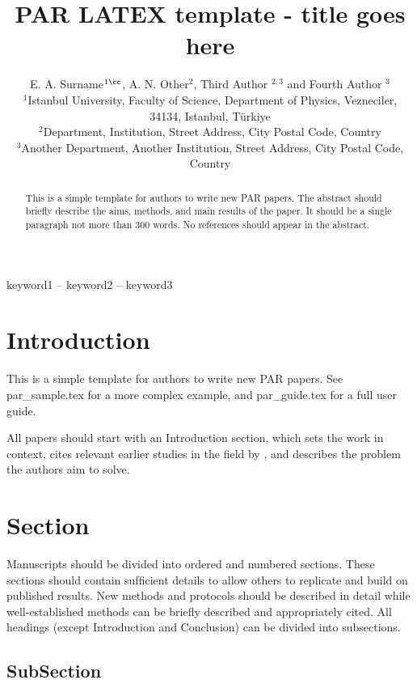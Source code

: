 \documentclass[arxiv,usenatbib]{iupartex}
\title[PAR LATEX template]{PAR LATEX template - title goes here}
\author[Surname et. al]{%
E. A. Surname$^{1\cc}$,\orcid{0000-000X-XXXX-AAAA}
A. N. Other$^{2}$,\orcid{0000-000X-XXXX-BBBB}
Third Author $^{2,3}$\orcid{0000-000X-XXXX-CCCC}
and
Fourth Author $^{3}$\orcid{0000-000X-XXXX-DDDD}
\affsep \\
$^1$Istanbul University, Faculty of Science, Department of Physics, Vezneciler, 34134, Istanbul, T\"{u}rkiye\\
$^2$Department, Institution, Street Address, City Postal Code, Country\\
$^3$Another Department, Another Institution, Street Address, City Postal Code, Country
}
\date{
	\pSubmit{00.00.0000} 
	\pRevReq{00.00.0000}
	\pLastRevRec{00.00.0000}
	\pAccept{00.00.0000}
	\pPubOnl{00.00.0000}
}
\begin{document}
\label{firstpage}
\pagerange{\pageref*{firstpage}--\pageref*{lastpage}}
\maketitle

\begin{abstract}
This is a simple template for authors to write new PAR papers. The abstract should briefly describe the aims, methods, and main results of the paper. It should be a single paragraph not more than 300 words. No references should appear in the abstract.
\end{abstract}

\begin{keywords}
keyword1 -- keyword2 -- keyword3
\end{keywords}



\section{Introduction}
This is a simple template for authors to write new PAR papers. See par\_sample.tex for a more complex example, and par\_guide.tex for a full user guide. 

All papers should start with an Introduction section, which sets the work in context, cites relevant earlier studies in the field by \cite{aut2018}, and describes the problem the authors aim to solve.
 

\section{Section}
Manuscripts should be divided into ordered and numbered sections. These sections should contain sufﬁcient details to allow others to replicate and build on published results. New methods and protocols should be described in detail while well-established methods can be brieﬂy described and appropriately cited. All headings (except Introduction and Conclusion) can be divided into subsections. 

\subsection{SubSection}
\end{document}
